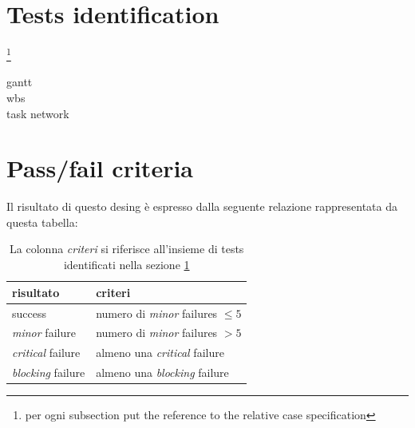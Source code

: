 \section{Tests identification}
\label{sec:GenerateChartTestIdentification}
\footnote{per ogni subsection put the reference to the relative case
specification}
\begin{description}
  \item[gantt]
  \item[wbs]
  \item[task network] 
\end{description}

\section{Pass/fail criteria}
Il risultato di questo desing \`e
espresso dalla seguente relazione rappresentata da questa tabella: 
\begin{table}[h!]
  \begin{center}
    \begin{tabular}{| l | l |}
    \hline
    \textbf{risultato} & \textbf{criteri} \\
	\hline    
	success & numero di \emph{minor} failures $\leq 5$   \\
    \hline
    \emph{minor} failure & numero di \emph{minor} failures $> 5$ \\
    \hline
    \emph{critical} failure & almeno una \emph{critical} failure \\
    \hline
    \emph{blocking} failure & almeno una \emph{blocking} failure \\
    \hline
    \end{tabular}
  \end{center}
	\caption{La colonna \emph{criteri} si riferisce all'insieme di tests 
	identificati nella sezione \ref{sec:GenerateChartTestIdentification}}
\end{table}

